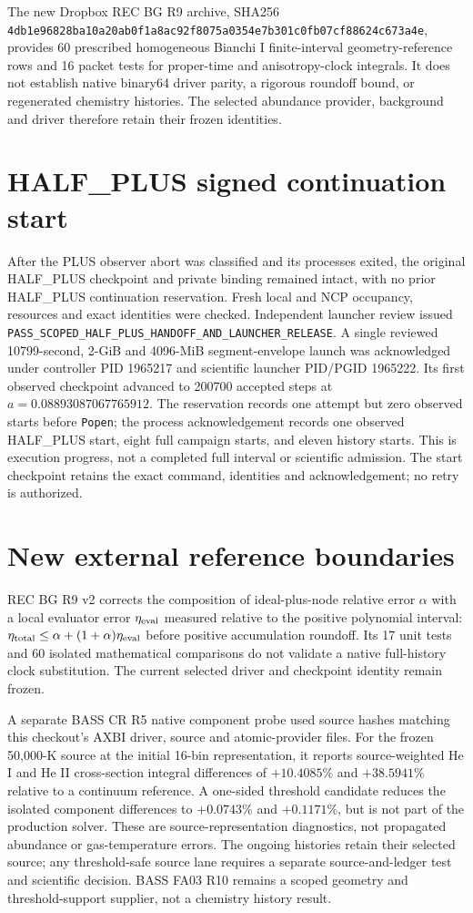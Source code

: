 \documentclass[11pt]{article}
\begin{document}
The new Dropbox REC BG R9 archive, SHA256 \texttt{4db1e96828ba10a20ab0f1a8ac92f8075a0354e7b301c0fb07cf88624c673a4e}, provides 60 prescribed homogeneous Bianchi I finite-interval geometry-reference rows and 16 packet tests for proper-time and anisotropy-clock integrals. It does not establish native binary64 driver parity, a rigorous roundoff bound, or regenerated chemistry histories. The selected abundance provider, background and driver therefore retain their frozen identities.

\section{HALF\_PLUS signed continuation start}
After the PLUS observer abort was classified and its processes exited, the original HALF\_PLUS checkpoint and private binding remained intact, with no prior HALF\_PLUS continuation reservation. Fresh local and NCP occupancy, resources and exact identities were checked. Independent launcher review issued \texttt{PASS\_SCOPED\_HALF\_PLUS\_HANDOFF\_AND\_LAUNCHER\_RELEASE}. A single reviewed 10799-second, 2-GiB and 4096-MiB segment-envelope launch was acknowledged under controller PID 1965217 and scientific launcher PID/PGID 1965222. Its first observed checkpoint advanced to 200700 accepted steps at $a=0.08893087067765912$. The reservation records one attempt but zero observed starts before \texttt{Popen}; the process acknowledgement records one observed HALF\_PLUS start, eight full campaign starts, and eleven history starts. This is execution progress, not a completed full interval or scientific admission. The start checkpoint retains the exact command, identities and acknowledgement; no retry is authorized.

\section{New external reference boundaries}
REC BG R9 v2 corrects the composition of ideal-plus-node relative error $\alpha$ with a local evaluator error $\eta_{\rm eval}$ measured relative to the positive polynomial interval: $\eta_{\rm total}\leq\alpha+(1+\alpha)\eta_{\rm eval}$ before positive accumulation roundoff. Its 17 unit tests and 60 isolated mathematical comparisons do not validate a native full-history clock substitution. The current selected driver and checkpoint identity remain frozen.

A separate BASS CR R5 native component probe used source hashes matching this checkout's AXBI driver, source and atomic-provider files. For the frozen 50,000-K source at the initial 16-bin representation, it reports source-weighted He I and He II cross-section integral differences of $+10.4085\%$ and $+38.5941\%$ relative to a continuum reference. A one-sided threshold candidate reduces the isolated component differences to $+0.0743\%$ and $+0.1171\%$, but is not part of the production solver. These are source-representation diagnostics, not propagated abundance or gas-temperature errors. The ongoing histories retain their selected source; any threshold-safe source lane requires a separate source-and-ledger test and scientific decision. BASS FA03 R10 remains a scoped geometry and threshold-support supplier, not a chemistry history result.
\end{document}
